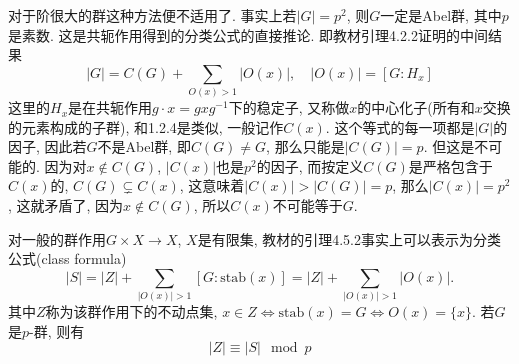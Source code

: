 \documentclass{../solutions-cn}
\begin{document}
\begin{remark}
    对于阶很大的群这种方法便不适用了. 事实上若$|G| = p^2$, 则$G$一定是Abel群, 其中$p$是素数. 这是共轭作用得到的分类公式的直接推论. 即教材引理4.2.2证明的中间结果
    \[
        |G| = C(G) + \sum_{O(x) > 1} |O(x)|,\quad |O(x)| = [G:H_x]
    \]
    这里的$H_x$是在共轭作用$g \cdot x = gxg^{-1}$下的稳定子, 又称做$x$的中心化子(所有和$x$交换的元素构成的子群), 和1.2.4是类似, 一般记作$C(x)$. 这个等式的每一项都是$|G|$的因子, 因此若$G$不是Abel群, 即$C(G) \neq G$, 那么只能是$|C(G)| = p$. 但这是不可能的. 因为对$x \notin C(G)$, $|C(x)|$也是$p^2$的因子, 而按定义$C(G)$是严格包含于$C(x)$的, $C(G) \subsetneq C(x)$, 这意味着$|C(x)| > |C(G)| = p$, 那么$|C(x)| = p^2$, 这就矛盾了, 因为$x \notin C(G)$, 所以$C(x)$不可能等于$G$.

    对一般的群作用$G \times X \to X$, $X$是有限集, 教材的引理4.5.2事实上可以表示为分类公式(class formula)
    \[
        |S| = |Z| + \sum_{|O(x)| > 1} [G:\mathrm{stab}(x)] = |Z| + \sum_{|O(x)| > 1} |O(x)|.
    \]
    其中$Z$称为该群作用下的不动点集, $x \in Z \iff \mathrm{stab}(x) = G \iff O(x) = \{x\}$. 若$G$是$p$-群, 则有
    \[
        |Z| \equiv |S| \mod p
    \]
\end{remark}
\end{document}
